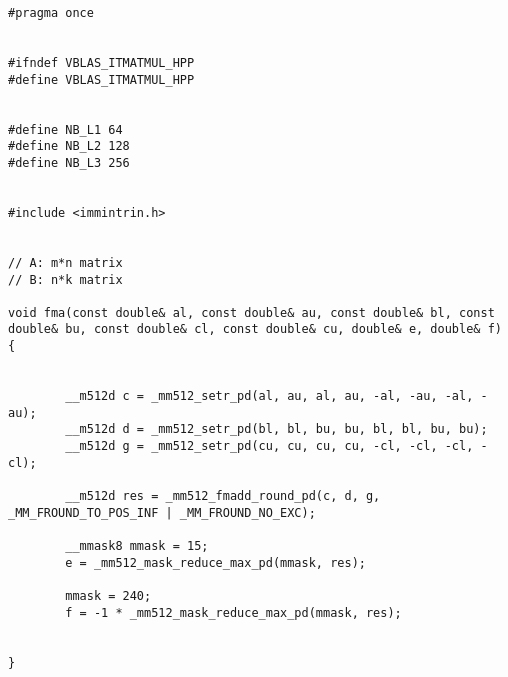 \documentclass[11pt,a4paper]{jsreport}
\theoremstyle{definition}
\begin{document}
\begin{lstlisting}[caption = 本研究で使用したプログラム]
#pragma once


#ifndef VBLAS_ITMATMUL_HPP
#define VBLAS_ITMATMUL_HPP


#define NB_L1 64
#define NB_L2 128
#define NB_L3 256


#include <immintrin.h>


// A: m*n matrix
// B: n*k matrix

void fma(const double& al, const double& au, const double& bl, const double& bu, const double& cl, const double& cu, double& e, double& f)
{
   
    
        __m512d c = _mm512_setr_pd(al, au, al, au, -al, -au, -al, -au);
        __m512d d = _mm512_setr_pd(bl, bl, bu, bu, bl, bl, bu, bu);
        __m512d g = _mm512_setr_pd(cu, cu, cu, cu, -cl, -cl, -cl, -cl);

        __m512d res = _mm512_fmadd_round_pd(c, d, g, _MM_FROUND_TO_POS_INF | _MM_FROUND_NO_EXC);

        __mmask8 mmask = 15;
        e = _mm512_mask_reduce_max_pd(mmask, res);

        mmask = 240;
        f = -1 * _mm512_mask_reduce_max_pd(mmask, res);


}



\end{lstlisting}
\end{document}
